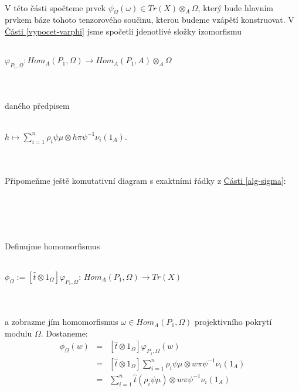       \paragraph{ } V této části spočteme prvek $\psi_\Omega(\omega)\in Tr(X)\otimes_A \Omega$, 
      který bude hlavním prvkem báze tohoto tenzorového součinu, kterou budeme vzápětí konstruovat. 
      V \hyperref[vypocet-varphi]{Části \ref*{vypocet-varphi}} jsme 
      spočetli jdenotlivé složky izomorfismu \\\\
      \centerline{$\varphi_{P_1,\Omega}:Hom_A(P_1,\Omega)\rightarrow Hom_A(P_1,A)\otimes_A \Omega$} 
      \\\\
      daného předpisem \\\\
      \centerline{$h\mapsto\sum_{i=1}^n \rho_i\psi\mu\otimes h\pi\psi^{-1}\nu_i(1_A)$.} 
      \\\\      
      Připomeňme ještě komutativní diagram s exaktními řádky z
      \hyperref[alg-sigma]{Části \ref*{alg-sigma}}:
      \\\\
        \centerline{ }\\\\\\
        Definujme homomorfismus \\\\        
        \centerline{$\phi_\Omega:=[\hat{t}\otimes1_\Omega]\varphi_{P_1,\Omega}:\, Hom_A(P_1,\Omega)\rightarrow Tr(X)$}\\\\
        a zobrazme jím homomorfismus
        $\omega\in Hom_A(P_1,\Omega)$
        projektivního pokrytí modulu $\Omega$. Dostaneme: 
         \begin{eqnarray}
           \phi_\Omega(w)
           &=& [\hat{t}\otimes1_\Omega]\varphi_{P_1, \Omega}(w)  \nonumber \\
           &=& [\hat{t}\otimes1_\Omega]\sum_{i=1}^n \rho_i\psi\mu\otimes w\pi\psi^{-1}\nu_i(1_A)  \nonumber \\
           &=& \sum_{i=1}^n \hat{t}(\rho_i\psi\mu)\otimes w\pi\psi^{-1}\nu_i(1_A) \nonumber 
         \end{eqnarray}   \\

